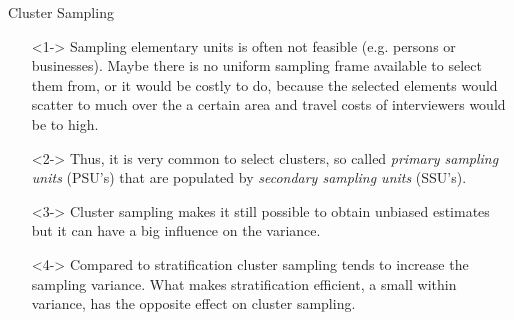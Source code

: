\documentclass{beamer}\usepackage[]{graphicx}\usepackage[]{color}
\begin{document}
\begin{frame}{Cluster Sampling}
\begin{itemize}
\item[]<1-> Sampling elementary units is often not feasible (e.g. persons or businesses). Maybe there is no uniform sampling frame available to select them from, or it would be costly to do, because the selected elements would scatter to much over the a certain area and travel costs of interviewers would be to high. 

\item[]<2-> Thus, it is very common to select clusters, so called \emph{primary sampling units} (PSU's) that are populated by \emph{secondary sampling units} (SSU's).

\item[]<3-> Cluster sampling makes it still possible to obtain unbiased estimates but it can have a big influence on the variance. 

\item[]<4-> Compared to stratification cluster sampling tends to increase the sampling variance. What makes stratification efficient, a small within variance, has the opposite effect on cluster sampling.

\end{itemize}

\end{frame}
\end{document}
